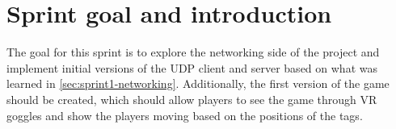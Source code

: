 \section{Sprint goal and introduction}\label{sec:sprint2-goals}
The goal for this sprint is to explore the networking side of the project and implement initial versions of the UDP client and server based on what was learned in \autoref{sec:sprint1-networking}.
Additionally, the first version of the game should be created, which should allow players to see the game through VR goggles and show the players moving based on the positions of the tags.
